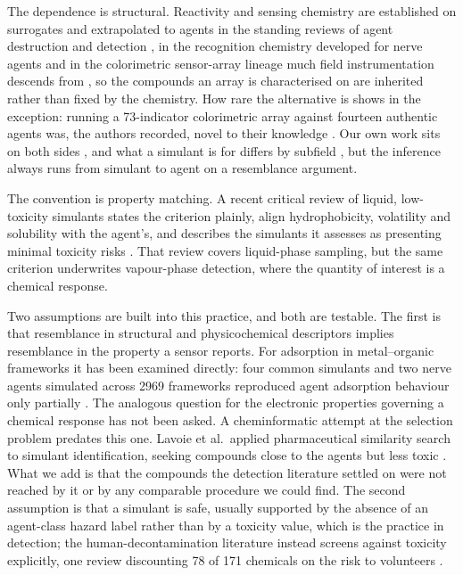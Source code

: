 \documentclass[journal=ancham,manuscript=article,margin=1in]{achemso}
\begin{document}
The dependence is structural. Reactivity and sensing chemistry are established
on surrogates and extrapolated to agents in the standing reviews of agent
destruction and detection \cite{kim2011,jang2015}, in the recognition chemistry
developed for nerve agents \cite{royo2007,sambrook2013,eubanks2007} and in the
colorimetric sensor-array lineage much field instrumentation descends from
\cite{rakow2000,askim2013}, so the compounds an array is characterised on are
inherited rather than fixed by the chemistry. How rare the alternative is shows
in the exception: running a 73-indicator colorimetric array against fourteen
authentic agents was, the authors recorded, novel to their knowledge
\cite{davidson2020}. Our own work sits on both sides
\cite{hazref,multiplexref,ondeviceref,group3ref}, and what a simulant is for
differs by subfield \cite{bartelthunt2008,mondloch2015,ebeam}, but the inference
always runs from simulant to agent on a resemblance argument.

The convention is property matching. A recent critical review of liquid,
low-toxicity simulants states the criterion plainly, align hydrophobicity,
volatility and solubility with the agent's, and describes the simulants it
assesses as presenting minimal toxicity risks \cite{webb2025}. That review
covers liquid-phase sampling, but the same criterion underwrites vapour-phase
detection, where the quantity of interest is a chemical response.

Two assumptions are built into this practice, and both are testable. The first
is that resemblance in structural and physicochemical descriptors implies
resemblance in the property a sensor reports. For adsorption in metal--organic
frameworks it has been examined directly: four common simulants and two nerve
agents simulated across 2969 frameworks reproduced agent adsorption behaviour
only partially \cite{agrawal2018}. The analogous question for the electronic
properties governing a chemical response has not been asked. A cheminformatic
attempt at the selection problem predates this one. Lavoie et al.\ applied
pharmaceutical similarity search to simulant identification, seeking compounds
close to the agents but less toxic \cite{lavoie2011}. What we add is that
the compounds the detection literature settled on were not reached by it or by
any comparable procedure we could find. The second assumption is that a simulant
is safe, usually supported by the absence of an agent-class hazard label rather
than by a toxicity value, which is the practice in detection; the
human-decontamination literature instead screens against toxicity explicitly,
one review discounting 78 of 171 chemicals on the risk to volunteers
\cite{james2021}.
\end{document}

